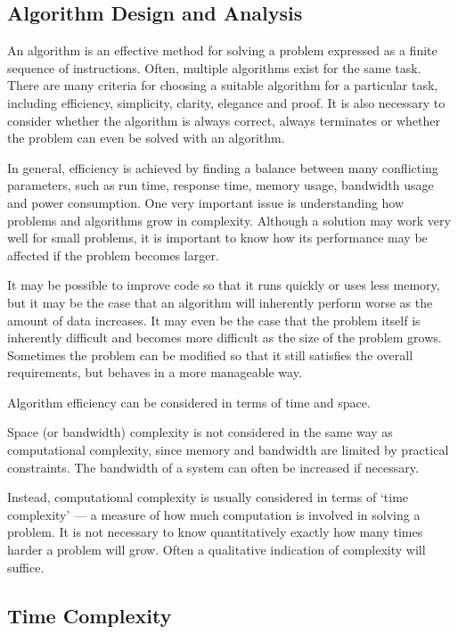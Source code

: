 \subsection{Algorithm Design and Analysis}

An algorithm is an effective method for solving a problem expressed as a finite sequence of instructions.
Often, multiple algorithms exist for the same task.
There are many criteria for choosing a suitable algorithm for a particular task, including efficiency, simplicity, clarity, elegance and proof.
It is also necessary to consider whether the algorithm is always correct, always terminates or whether the problem can even be solved with an algorithm.

In general, efficiency is achieved by finding a balance between many conflicting parameters, such as run time, response time, memory usage, bandwidth usage and power consumption.
One very important issue is understanding how problems and algorithms grow in complexity.
Although a solution may work very well for small problems, it is important to know how its performance may be affected if the problem becomes larger.

It may be possible to improve code so that it runs quickly or uses less memory, but it may be the case that an algorithm will inherently perform worse as the amount of data increases.
It may even be the case that the problem itself is inherently difficult and becomes more difficult as the size of the problem grows.
Sometimes the problem can be modified so that it still satisfies the overall requirements, but behaves in a more manageable way.

Algorithm efficiency can be considered in terms of time and space.

Space (or bandwidth) complexity is not considered in the same way as computational complexity, since memory and bandwidth are limited by practical constraints.
The bandwidth of a system can often be increased if necessary.

Instead, computational complexity is usually considered in terms of `time complexity' --- a measure of how much computation is involved in solving a problem.
It is not necessary to know quantitatively exactly how many times harder a problem will grow.
Often a qualitative indication of complexity will suffice.

\subsection{Time Complexity}

